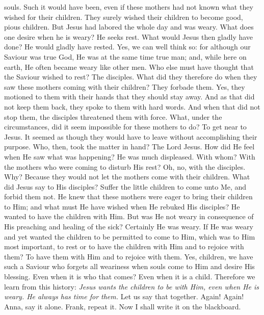 souls. Such it would have been, even if these mothers had not known what they wished for their children. They surely wished their children to become good, pious children. But Jesus had labored the whole day and was weary. What does one desire when he is weary? He seeks rest. What would Jesus then gladly have done? He would gladly have rested. Yes, we can well think so: for although our Saviour was true God, He was at the same time true man; and, while here on earth, He often became weary like other men. Who else must have thought that the Saviour wished to rest? The disciples. What did they therefore do when they saw these mothers coming with their children? They forbade them. Yes, they motioned to them with their hands that they should stay away. And as that did not keep them back, they spoke to them with hard words. And when that did not stop them, the disciples threatened them with force. What, under the circumstances, did it seem impossible for these mothers to do? To get near to Jesus. It seemed as though they would have to leave without accomplishing their purpose. Who, then, took the matter in hand? The Lord Jesus. How did He feel when He saw what was happening? He was much displeased. With whom? With the mothers who were coming to disturb His rest? Oh, no, with the disciples. Why? Because they would not let the mothers come with their children. What did Jesus say to His disciples? Suffer the little children to come unto Me, and forbid them not. He knew that these mothers were eager to bring their children to Him; and what must He have wished when He rebuked His disciples? He wanted to have the children with Him. But was He not weary in consequence of His preaching and healing of the sick? Certainly He was weary. If He was weary and yet wanted the children to be permitted to come to Him, which was to Him most important, to rest or to have the children with Him and to rejoice with them? To have them with Him and to rejoice with them. Yes, children, we have such a Saviour who forgets all weariness when souls come to Him and desire His blessing. Even when it is who that comes? Even when it is a child. Therefore we learn from this history: \emph{Jesus wants the children to be with Him, even when He is weary. He always has time for them.} Let us say that together. Again! Again! Anna, say it alone. Frank, repeat it. Now I shall write it on the blackboard.


